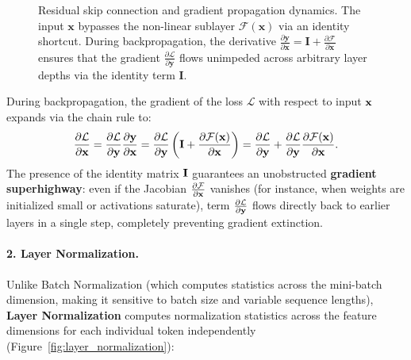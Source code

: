 \documentclass[../../main.tex]{subfiles}
\begin{document}
\begin{figure}[htbp]
{\begin{tikzpicture}
\end{tikzpicture}%
}
\caption{Residual skip connection and gradient propagation dynamics. The input $\mathbf{x}$ bypasses the non-linear sublayer $\mathcal{F}(\mathbf{x})$ via an identity shortcut. During backpropagation, the derivative $\frac{\partial \mathbf{y}}{\partial \mathbf{x}} = \mathbf{I} + \frac{\partial \mathcal{F}}{\partial \mathbf{x}}$ ensures that the gradient $\frac{\partial \mathcal{L}}{\partial \mathbf{y}}$ flows unimpeded across arbitrary layer depths via the identity term $\mathbf{I}$.}
\label{fig:residual_connections}
\end{figure}

During backpropagation, the gradient of the loss $\mathcal{L}$ with respect to input $\mathbf{x}$ expands via the chain rule to:
\begin{equation}
\label{eq:residual_gradient_flow}
\frac{\partial \mathcal{L}}{\partial \mathbf{x}} = \frac{\partial \mathcal{L}}{\partial \mathbf{y}} \frac{\partial \mathbf{y}}{\partial \mathbf{x}} = \frac{\partial \mathcal{L}}{\partial \mathbf{y}} \left( \mathbf{I} + \frac{\partial \mathcal{F}(\mathbf{x})}{\partial \mathbf{x}} \right) = \frac{\partial \mathcal{L}}{\partial \mathbf{y}} + \frac{\partial \mathcal{L}}{\partial \mathbf{y}} \frac{\partial \mathcal{F}(\mathbf{x})}{\partial \mathbf{x}}.
\end{equation}
The presence of the identity matrix $\mathbf{I}$ guarantees an unobstructed \textbf{gradient superhighway}: even if the Jacobian $\frac{\partial \mathcal{F}}{\partial \mathbf{x}}$ vanishes (for instance, when weights are initialized small or activations saturate), term $\frac{\partial \mathcal{L}}{\partial \mathbf{y}}$ flows directly back to earlier layers in a single step, completely preventing gradient extinction.

\paragraph{2. Layer Normalization.}
Unlike Batch Normalization (which computes statistics across the mini-batch dimension, making it sensitive to batch size and variable sequence lengths), \textbf{Layer Normalization} \cite{ba2016layer} computes normalization statistics across the feature dimensions for each individual token independently (Figure~\ref{fig:layer_normalization}):
\end{document}
